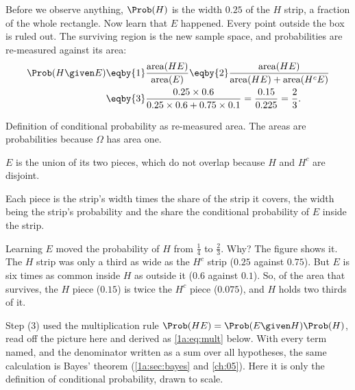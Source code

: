 Before we observe anything, $\Prob(H)$ is the width $0.25$ of the $H$ strip, a
fraction of the whole rectangle. Now learn that $E$ happened. Every point
outside the box is ruled out. The surviving region is the new sample space, and
probabilities are re-measured against its area:
\begin{align*}
\Prob(H\given E)
&\eqby{1}\frac{\text{area}(HE)}{\text{area}(E)}
 \eqby{2}\frac{\text{area}(HE)}{\text{area}(HE)+\text{area}(H^cE)}\\
&\eqby{3}\frac{0.25\times0.6}{0.25\times0.6+0.75\times0.1}
 =\frac{0.15}{0.225}=\frac23 .
\end{align*}
\begin{explain}
  \item Definition of conditional probability as re-measured area. The areas
        are probabilities because $\Omega$ has area one.
  \item $E$ is the union of its two pieces, which do not overlap because $H$ and
        $H^c$ are disjoint.
  \item Each piece is the strip's width times the share of the strip it
        covers, the width being the strip's probability and the share the
        conditional probability of $E$ inside the strip.
\end{explain}
Learning $E$ moved the probability of $H$ from $\tfrac14$ to $\tfrac23$. Why?
The figure shows it. The $H$ strip was only a third as wide as the $H^c$ strip
($0.25$ against $0.75$). But $E$ is six times as common inside $H$ as outside it
($0.6$ against $0.1$). So, of the area that survives, the $H$ piece ($0.15$) is
twice the $H^c$ piece ($0.075$), and $H$ holds two thirds of it.

Step (3) used the multiplication rule $\Prob(HE)=\Prob(E\given H)\Prob(H)$, read
off the picture here and derived as \eqref{1a:eq:mult} below. With every term
named, and the denominator written as a sum over all hypotheses, the same
calculation is Bayes' theorem (\cref{1a:sec:bayes} and \cref{ch:05}). Here it
is only the definition of conditional probability, drawn to scale.

